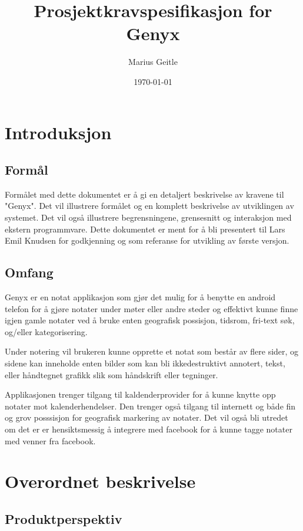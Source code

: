 \documentclass[a4paper, 12pt]{article}
\begin{document}
\title{Prosjektkravspesifikasjon for Genyx}
\author{Marius Geitle}
\date{\today}

\maketitle

\section{Introduksjon}
\subsection{Formål}
Formålet med dette dokumentet er å gi en detaljert beskrivelse av kravene til "Genyx". Det vil illustrere formålet og en komplett beskrivelse av utviklingen av systemet. Det vil også illustrere begrensningene, grensesnitt og interaksjon med ekstern programmvare. Dette dokumentet er ment for å bli presentert til Lars Emil Knudsen for godkjenning og som referanse for utvikling av første versjon.


\subsection{Omfang}
Genyx er en notat applikasjon som gjør det mulig for å benytte en android telefon for å gjøre notater under møter eller andre steder og effektivt kunne finne igjen gamle notater ved å bruke enten geografisk possisjon, tidsrom, fri-text søk, og/eller kategorisering.

Under notering vil brukeren kunne opprette et notat som består av flere sider, og sidene kan inneholde enten bilder som kan bli ikkedestruktivt annotert, tekst, eller håndtegnet grafikk slik som håndskrift eller tegninger.

Applikasjonen trenger tilgang til kaldenderprovider for å kunne knytte opp notater mot kalenderhendelser. Den trenger også tilgang til internett og både fin og grov posssisjon for geografisk markering av notater. Det vil også bli utredet om det er er hensiktsmessig å integrere med facebook for å kunne tagge notater med venner fra facebook.

\section{Overordnet beskrivelse}
\subsection{Produktperspektiv}
\end{document}
